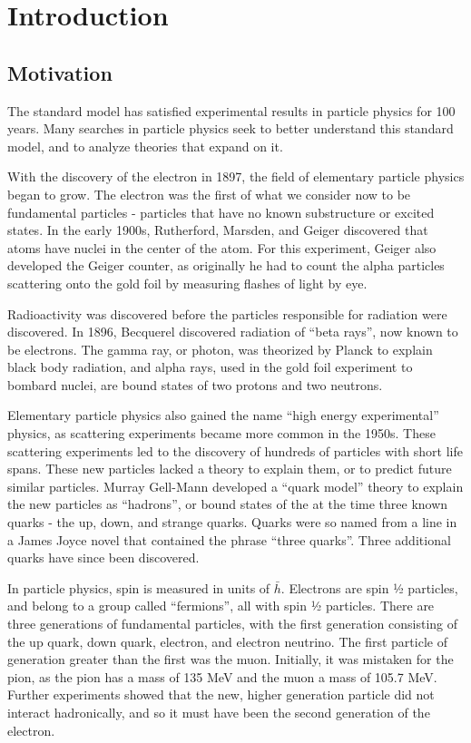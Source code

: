 \chapter{Introduction}\label{chap:intro}

\section{Motivation}\label{sec:ch1:intro}

The standard model has satisfied experimental results in particle physics for 100 years. Many searches in particle physics seek to better understand this standard model, and to analyze theories that expand on it.

With the discovery of the electron in 1897, the field of elementary particle physics began to grow. The electron was the first of what we consider now to be fundamental particles - particles that have no known substructure or excited states. In the early 1900s, Rutherford, Marsden, and Geiger discovered that atoms have nuclei in the center of the atom. For this experiment, Geiger also developed the Geiger counter, as originally he had to count the alpha particles scattering onto the gold foil by measuring flashes of light by eye.

Radioactivity was discovered before the particles responsible for radiation were discovered. In 1896, Becquerel discovered radiation of “beta rays”, now known to be electrons. The gamma ray, or photon, was theorized by Planck to explain black body radiation, and alpha rays, used in the gold foil experiment to bombard nuclei, are bound states of two protons and two neutrons. 

Elementary particle physics also gained the name “high energy experimental” physics, as scattering experiments became more common in the 1950s. These scattering experiments led to the discovery of hundreds of particles with short life spans. These new particles lacked a theory to explain them, or to predict future similar particles. Murray Gell-Mann developed a “quark model” theory to explain the new particles as “hadrons”, or bound states of the at the time three known quarks - the up, down, and strange quarks. Quarks were so named from a line in a James Joyce novel that contained the phrase “three quarks”. Three additional quarks have since been discovered.

In particle physics, spin is measured in units of $\bar{h}$. Electrons are spin ½ particles, and belong to a group called “fermions”, all with spin ½ particles. There are three generations of fundamental particles, with the first generation consisting of the up quark, down quark, electron, and electron neutrino. The first particle of generation greater than the first was the muon. Initially, it was mistaken for the pion, as the pion has a mass of 135 MeV and the muon a mass of 105.7 MeV. Further experiments showed that the new, higher generation particle did not interact hadronically, and so it must have been the second generation of the electron.

